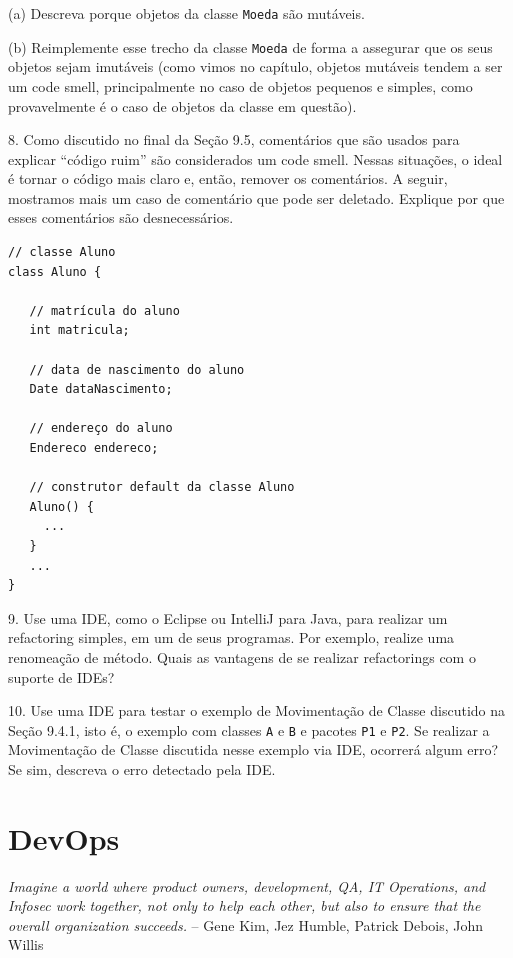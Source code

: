 \documentclass[
  11pt,
  twoside]{book}
\newcommand{\passthrough}[1]{#1}
\renewenvironment{quote}{\centering \vspace{1.5ex} \begin{tcolorbox}[colback=backcolor, width=4.9in]}{\end{tcolorbox}}
\begin{document}
(a) Descreva porque objetos da classe \passthrough{\lstinline!Moeda!}
são mutáveis.

(b) Reimplemente esse trecho da classe \passthrough{\lstinline!Moeda!}
de forma a assegurar que os seus objetos sejam imutáveis (como vimos no
capítulo, objetos mutáveis tendem a ser um code smell, principalmente no
caso de objetos pequenos e simples, como provavelmente é o caso de
objetos da classe em questão).

8. Como discutido no final da Seção 9.5, comentários que são usados para
explicar ``código ruim'' são considerados um code smell. Nessas
situações, o ideal é tornar o código mais claro e, então, remover os
comentários. A seguir, mostramos mais um caso de comentário que pode ser
deletado. Explique por que esses comentários são desnecessários.

\begin{lstlisting}
// classe Aluno
class Aluno {
   
   // matrícula do aluno
   int matricula;
   
   // data de nascimento do aluno
   Date dataNascimento;
   
   // endereço do aluno
   Endereco endereco;
   
   // construtor default da classe Aluno
   Aluno() {
     ...
   } 
   ...  
}
\end{lstlisting}

9. Use uma IDE, como o Eclipse ou IntelliJ para Java, para realizar um
refactoring simples, em um de seus programas. Por exemplo, realize uma
renomeação de método. Quais as vantagens de se realizar refactorings com
o suporte de IDEs?

10. Use uma IDE para testar o exemplo de Movimentação de Classe
discutido na Seção 9.4.1, isto é, o exemplo com classes
\passthrough{\lstinline!A!} e \passthrough{\lstinline!B!} e pacotes
\passthrough{\lstinline!P1!} e \passthrough{\lstinline!P2!}. Se realizar
a Movimentação de Classe discutida nesse exemplo via IDE, ocorrerá algum
erro? Se sim, descreva o erro detectado pela IDE.

\hypertarget{devops}{%
\chapter{DevOps}\label{devops}}

\begin{quote}
\emph{Imagine a world where product owners, development, QA, IT
Operations, and Infosec work together, not only to help each other, but
also to ensure that the overall organization succeeds.} -- Gene Kim, Jez
Humble, Patrick Debois, John Willis
\end{quote}
\end{document}
